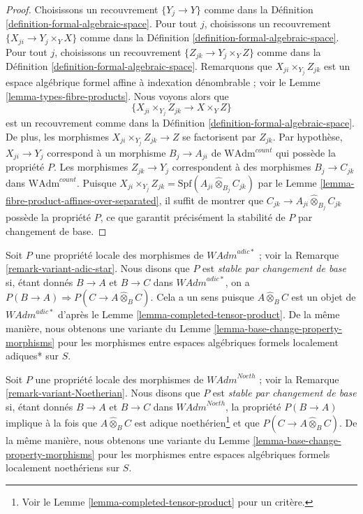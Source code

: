 \begin{proof}
Choisissons un recouvrement $\{Y_j \to Y\}$ comme dans la
Définition \ref{definition-formal-algebraic-space}.
Pour tout $j$, choisissons un recouvrement $\{X_{ji} \to Y_j \times_Y X\}$
comme dans la Définition \ref{definition-formal-algebraic-space}.
Pour tout $j$, choisissons un recouvrement $\{Z_{jk} \to Y_j \times_Y Z\}$
comme dans la Définition \ref{definition-formal-algebraic-space}.
Remarquons que $X_{ji} \times_{Y_j} Z_{jk}$ est un
espace algébrique formel affine à indexation dénombrable ; voir le
Lemme \ref{lemma-types-fibre-products}.
Nous voyons alors que
$$
\{X_{ji} \times_{Y_j} Z_{jk} \to X \times_Y Z\}
$$
est un recouvrement comme dans la Définition \ref{definition-formal-algebraic-space}.
De plus, les morphismes $X_{ji} \times_{Y_j} Z_{jk} \to Z$
se factorisent par $Z_{jk}$. Par hypothèse,
$X_{ji} \to Y_j$ correspond à un morphisme $B_j \to A_{ji}$ de
$\text{WAdm}^{count}$ qui possède la propriété $P$.
Les morphismes $Z_{jk} \to Y_j$ correspondent à des morphismes $B_j \to C_{jk}$ dans
$\text{WAdm}^{count}$. Puisque
$X_{ji} \times_{Y_j} Z_{jk} =
\text{Spf}(A_{ji} \widehat{\otimes}_{B_j} C_{jk})$
par le Lemme \ref{lemma-fibre-product-affines-over-separated},
il suffit de montrer que
$C_{jk} \to A_{ji} \widehat{\otimes}_{B_j} C_{jk}$
possède la propriété $P$, ce que garantit précisément
la stabilité de $P$ par changement de base.
\end{proof}

\begin{remark}
\label{remark-base-change-variant-adic-star}
Soit $P$ une propriété locale des morphismes de $\textit{WAdm}^{adic*}$ ; voir la
Remarque \ref{remark-variant-adic-star}. Nous disons que $P$ est {\it stable par
changement de base} si, étant donnés $B \to A$ et $B \to C$ dans $\textit{WAdm}^{adic*}$,
on a $P(B \to A) \Rightarrow P(C \to A \widehat{\otimes}_B C)$.
Cela a un sens puisque $A \widehat{\otimes}_B C$ est un objet de
$\textit{WAdm}^{adic*}$ d'après le Lemme \ref{lemma-completed-tensor-product}.
De la même manière, nous obtenons une variante du
Lemme \ref{lemma-base-change-property-morphisms}
pour les morphismes entre espaces algébriques formels localement adiques* sur $S$.
\end{remark}

\begin{remark}
\label{remark-base-change-variant-Noetherian}
Soit $P$ une propriété locale des morphismes de $\textit{WAdm}^{Noeth}$ ; voir la
Remarque \ref{remark-variant-Noetherian}. Nous disons que $P$ est
{\it stable par changement de base} si, étant donnés $B \to A$ et $B \to C$
dans $\textit{WAdm}^{Noeth}$, la propriété $P(B \to A)$
implique à la fois que $A \widehat{\otimes}_B C$ est adique
noethérien\footnote{Voir le Lemme \ref{lemma-completed-tensor-product}
pour un critère.} et que
$P(C \to A \widehat{\otimes}_B C)$.
De la même manière, nous obtenons une variante du
Lemme \ref{lemma-base-change-property-morphisms}
pour les morphismes entre espaces algébriques formels localement noethériens sur $S$.
\end{remark}

